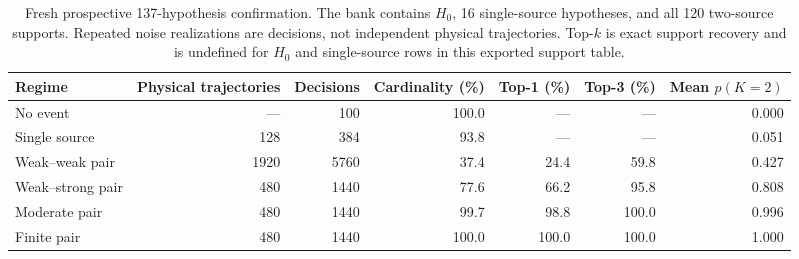 \begin{table}[t]
\caption{Fresh prospective 137-hypothesis confirmation. The bank contains $H_0$, 16 single-source hypotheses, and all 120 two-source supports. Repeated noise realizations are decisions, not independent physical trajectories. Top-$k$ is exact support recovery and is undefined for $H_0$ and single-source rows in this exported support table.}
\label{tab:global137-results}
\centering
\footnotesize
\begin{tabular}{lrrrrrr}
\toprule
Regime & Physical trajectories & Decisions & Cardinality (\%) & Top-1 (\%) & Top-3 (\%) & Mean $p(K=2)$ \\
\midrule
No event & --- & 100 & 100.0 & --- & --- & 0.000 \\
Single source & 128 & 384 & 93.8 & --- & --- & 0.051 \\
Weak--weak pair & 1920 & 5760 & 37.4 & 24.4 & 59.8 & 0.427 \\
Weak--strong pair & 480 & 1440 & 77.6 & 66.2 & 95.8 & 0.808 \\
Moderate pair & 480 & 1440 & 99.7 & 98.8 & 100.0 & 0.996 \\
Finite pair & 480 & 1440 & 100.0 & 100.0 & 100.0 & 1.000 \\
\bottomrule
\end{tabular}
\end{table}
